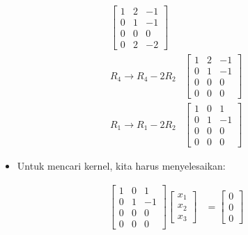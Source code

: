 \documentclass[12pt, a4paper]{scrartcl}
\begin{document}
\begin{enumerate}
\begin{enumerate}
\begin{align*}
\begin{bmatrix}
                    1 & 2 & -1\\
                    0 & 1 & -1\\
                    0 & 0 & 0\\
                    0 & 2 & -2
                \end{bmatrix} \\R_4\to R_4-2R_2 &\begin{bmatrix}
                    1 & 2 & -1\\
                    0 & 1 & -1\\
                    0 & 0 & 0\\
                    0 & 0 & 0
                \end{bmatrix} \\R_1\to R_1-2R_2 &\begin{bmatrix}
                    1 & 0 & 1\\
                    0 & 1 & -1\\
                    0 & 0 & 0\\
                    0 & 0 & 0
                \end{bmatrix}
            \end{align*}

            \begin{itemize}
                \item[] Untuk mencari kernel, kita harus menyelesaikan:
            \end{itemize}
            \begin{align*}
                \begin{bmatrix}
                    1 & 0 & 1\\
                    0 & 1 & -1\\
                    0 & 0 & 0\\
                    0 & 0 & 0
                \end{bmatrix} \begin{bmatrix}
                    x_1\\x_2\\x_3
                \end{bmatrix} &= \begin{bmatrix}
                    0\\0\\0
                \end{bmatrix}
            \end{align*}


\end{enumerate}
\end{enumerate}
\end{document}

